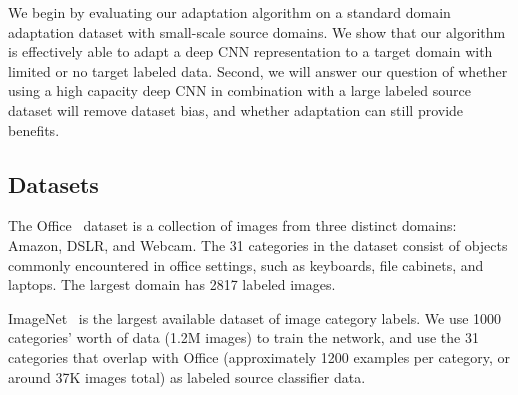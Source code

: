 \label{sec:eval}

We begin by evaluating our adaptation algorithm on a standard domain adaptation dataset with small-scale source domains.
We show that our algorithm is effectively able to adapt a deep CNN representation to a target domain with limited or no
target labeled data.
Second, we will answer our question of whether using a high capacity deep CNN in combination with a large labeled source dataset will remove dataset
bias, and whether adaptation can still provide benefits.



\subsection{Datasets}
The Office~\cite{saenko-eccv10} dataset is a collection of images from three
distinct domains: Amazon, DSLR, and Webcam. The 31 categories in the dataset
consist of objects commonly encountered in office settings, such as keyboards,
file cabinets, and laptops. The largest domain has 2817 labeled images.

ImageNet~\cite{ilsvrc2012} is the largest available dataset of image category labels. We use 1000 categories' worth of data (1.2M images) to train the network, and use the 31 categories that overlap with Office (approximately 1200 examples per category, or around 37K images total) as labeled source classifier data.

